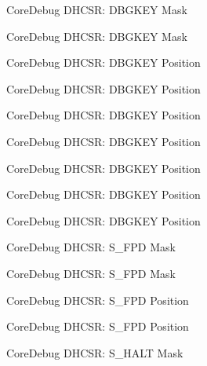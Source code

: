 \begin{DoxyRefList}
\label{deprecated__deprecated000378}%
%
Core\+Debug D\+H\+C\+SR\+: D\+B\+G\+K\+EY Mask 

\label{deprecated__deprecated000457}%
%
Core\+Debug D\+H\+C\+SR\+: D\+B\+G\+K\+EY Mask  
\item[Member \mbox{\hyperlink{group__CMSIS__CoreDebug_gac91280edd0ce932665cf75a23d11d842}{Core\+Debug\+\_\+\+D\+H\+C\+S\+R\+\_\+\+D\+B\+G\+K\+E\+Y\+\_\+\+Pos}} ]\label{deprecated__deprecated000005}%
%
Core\+Debug D\+H\+C\+SR\+: D\+B\+G\+K\+EY Position 

\label{deprecated__deprecated000105}%
%
Core\+Debug D\+H\+C\+SR\+: D\+B\+G\+K\+EY Position 

\label{deprecated__deprecated000159}%
%
Core\+Debug D\+H\+C\+SR\+: D\+B\+G\+K\+EY Position 

\label{deprecated__deprecated000244}%
%
Core\+Debug D\+H\+C\+SR\+: D\+B\+G\+K\+EY Position 

\label{deprecated__deprecated000301}%
%
Core\+Debug D\+H\+C\+SR\+: D\+B\+G\+K\+EY Position 

\label{deprecated__deprecated000377}%
%
Core\+Debug D\+H\+C\+SR\+: D\+B\+G\+K\+EY Position 

\label{deprecated__deprecated000456}%
%
Core\+Debug D\+H\+C\+SR\+: D\+B\+G\+K\+EY Position  
\item[Member \mbox{\hyperlink{group__CMSIS__CoreDebug_gae37ad624177fe2d3298fd32d528805aa}{Core\+Debug\+\_\+\+D\+H\+C\+S\+R\+\_\+\+S\+\_\+\+F\+P\+D\+\_\+\+Msk}} ]\label{deprecated__deprecated000014}%
%
Core\+Debug D\+H\+C\+SR\+: S\+\_\+\+F\+PD Mask 

\label{deprecated__deprecated000465}%
%
Core\+Debug D\+H\+C\+SR\+: S\+\_\+\+F\+PD Mask  
\item[Member \mbox{\hyperlink{group__CMSIS__CoreDebug_ga620b141720c475f5bde4138855c6ed83}{Core\+Debug\+\_\+\+D\+H\+C\+S\+R\+\_\+\+S\+\_\+\+F\+P\+D\+\_\+\+Pos}} ]\label{deprecated__deprecated000013}%
%
Core\+Debug D\+H\+C\+SR\+: S\+\_\+\+F\+PD Position 

\label{deprecated__deprecated000464}%
%
Core\+Debug D\+H\+C\+SR\+: S\+\_\+\+F\+PD Position  
\item[Member \mbox{\hyperlink{group__CMSIS__CoreDebug_ga9f881ade3151a73bc5b02b73fe6473ca}{Core\+Debug\+\_\+\+D\+H\+C\+S\+R\+\_\+\+S\+\_\+\+H\+A\+L\+T\+\_\+\+Msk}} ]\label{deprecated__deprecated000026}%
%
Core\+Debug D\+H\+C\+SR\+: S\+\_\+\+H\+A\+LT Mask 


\end{DoxyRefList}
